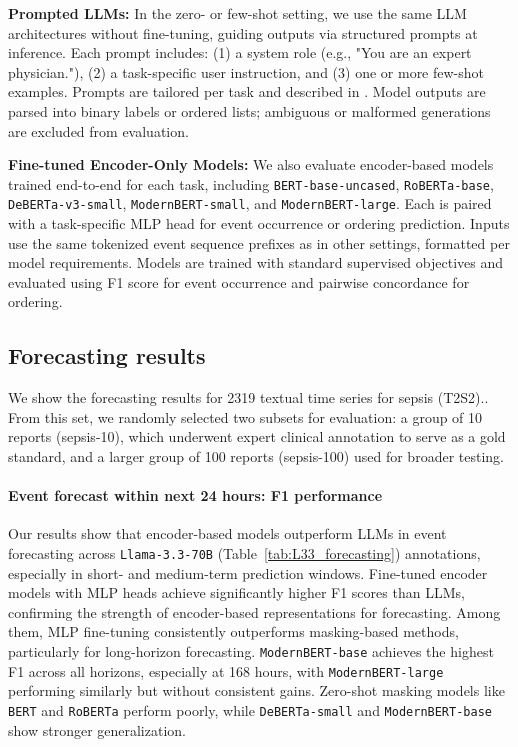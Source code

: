 \textbf{Prompted LLMs:} In the zero- or few-shot setting, we use the same LLM architectures without fine-tuning, guiding outputs via structured prompts at inference. Each prompt includes: (1) a system role (e.g., "You are an expert physician."), (2) a task-specific user instruction, and (3) one or more few-shot examples. Prompts are tailored per task and described in \cite{noroozizadeh2025forecasting}. Model outputs are parsed into binary labels or ordered lists; ambiguous or malformed generations are excluded from evaluation.

\textbf{Fine-tuned Encoder-Only Models:} We also evaluate encoder-based models trained end-to-end for each task, including \texttt{BERT-base-uncased}, \texttt{RoBERTa-base}, \texttt{DeBERTa-v3-small}, \texttt{ModernBERT-small}, and \texttt{ModernBERT-large}. Each is paired with a task-specific MLP head for event occurrence or ordering prediction. Inputs use the same tokenized event sequence prefixes as in other settings, formatted per model requirements. Models are trained with standard supervised objectives and evaluated using F1 score for event occurrence and pairwise concordance for ordering.


% 
%
% 
\subsection{Forecasting results}

We show the forecasting results for 2319 textual time series for sepsis (T2S2).\cite{noroozizadeh2025forecasting}. From this set, we randomly selected two subsets for evaluation: a group of 10 reports (sepsis-10), which underwent expert clinical annotation to serve as a gold standard, and a larger group of 100 reports (sepsis-100) used for broader testing. 



\paragraph{Event forecast within next 24 hours: F1 performance} Our results show that encoder-based models outperform LLMs in event forecasting across \texttt{Llama-3.3-70B} (Table~\ref{tab:L33_forecasting}) annotations, especially in short- and medium-term prediction windows. Fine-tuned encoder models with MLP heads achieve significantly higher F1 scores than LLMs, confirming the strength of encoder-based representations for forecasting. Among them, MLP fine-tuning consistently outperforms masking-based methods, particularly for long-horizon forecasting. \texttt{ModernBERT-base} achieves the highest F1 across all horizons, especially at 168 hours, with \texttt{ModernBERT-large} performing similarly but without consistent gains. Zero-shot masking models like \texttt{BERT} and \texttt{RoBERTa} perform poorly, while \texttt{DeBERTa-small} and \texttt{ModernBERT-base} show stronger generalization.

